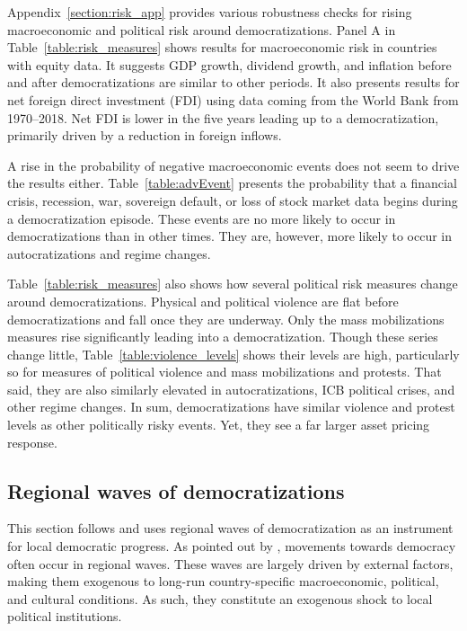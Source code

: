 Appendix~\ref{section:risk_app} provides various robustness checks for rising macroeconomic and political risk around democratizations. Panel A in Table~\ref{table:risk_measures} shows results for macroeconomic risk in countries with equity data. It suggests GDP growth, dividend growth, and inflation before and after democratizations are similar to other periods. It also presents results for net foreign direct investment (FDI) using data coming from the World Bank from 1970--2018. Net FDI is lower in the five years leading up to a democratization, primarily driven by a reduction in foreign inflows.

A rise in the probability of negative macroeconomic events does not seem to drive the results either. Table~\ref{table:advEvent} presents the probability that a financial crisis, recession, war, sovereign default, or loss of stock market data begins during a democratization episode. These events are no more likely to occur in democratizations than in other times. They are, however, more likely to occur in autocratizations and regime changes. 

Table~\ref{table:risk_measures} also shows how several political risk measures change around democratizations. Physical and political violence are flat before democratizations and fall once they are underway. Only the mass mobilizations measures rise significantly leading into a democratization. Though these series change little, Table~\ref{table:violence_levels} shows their levels are high, particularly so for measures of political violence and mass mobilizations and protests. That said, they are also similarly elevated in autocratizations, ICB political crises, and other regime changes. In sum, democratizations have similar violence and protest levels as other politically risky events. Yet, they see a far larger asset pricing response.

\subsection{Regional waves of democratizations}\label{section:regional_waves}

This section follows \cite{Acemoglu2019} and uses regional waves of democratization as an instrument for local democratic progress. As pointed out by \citet{Huntington1991}, movements towards democracy often occur in regional waves. These waves are largely driven by external factors, making them exogenous to long-run country-specific macroeconomic, political, and cultural conditions. As such, they constitute an exogenous shock to local political institutions.

